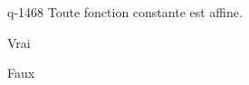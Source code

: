 \begin{truefalse}{q-1468}
Toute fonction constante est affine.
\item* Vrai
\item Faux
\end{truefalse}

